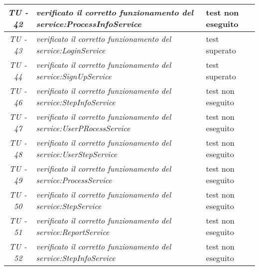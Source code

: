 \begin{small}\centering
\begin{tabular}{|c|p{8.0cm}|p{2.0cm}|}
\textit{TU - 42} &
\textit{verificato il corretto funzionamento del service:ProcessInfoService} & test non eseguito \\
\hline

\textit{TU - 43} &
\textit{verificato il corretto funzionamento del service:LoginService} & test superato \\
\hline

\textit{TU - 44} &
\textit{verificato il corretto funzionamento del service:SignUpService} & test superato \\
\hline

\textit{TU - 46} &
\textit{verificato il corretto funzionamento del service:StepInfoService} & test non eseguito \\
\hline

\textit{TU - 47} &
\textit{verificato il corretto funzionamento del service:UserPRocessService} & test non eseguito \\
\hline

\textit{TU - 48} &
\textit{verificato il corretto funzionamento del service:UserStepService} & test non eseguito \\
\hline

\textit{TU - 49} &
\textit{verificato il corretto funzionamento del service:ProcessService} & test non eseguito \\
\hline

\textit{TU - 50} &
\textit{verificato il corretto funzionamento del service:StepService} & test non eseguito \\
\hline

\textit{TU - 51} &
\textit{verificato il corretto funzionamento del service:ReportService} & test non eseguito \\
\hline

\textit{TU - 52} &
\textit{verificato il corretto funzionamento del service:StepInfoService} & test non eseguito \\
\hline
\end{tabular}\\
\end{small}

